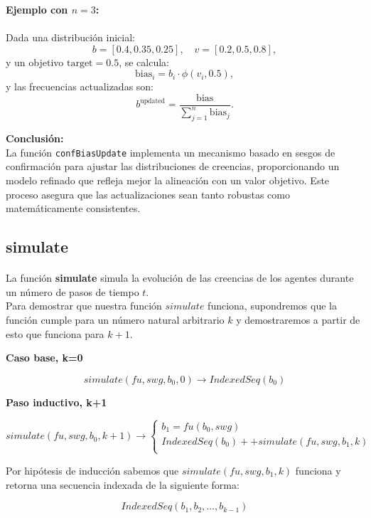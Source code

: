 \documentclass{article}
\begin{document}
	\textbf{Ejemplo con $n=3$:}\\\\
	Dada una distribución inicial:
	\[
	b = [0.4, 0.35, 0.25], \quad v = [0.2, 0.5, 0.8],
	\]
	y un objetivo $\text{target} = 0.5$, se calcula:
	\[
	\text{bias}_i = b_i \cdot \phi(v_i, 0.5),
	\]
	y las frecuencias actualizadas son:
	\[
	b^{\text{updated}} = \frac{\text{bias}}{\sum_{j=1}^n \text{bias}_j}.
	\]
	
	\textbf{Conclusión:}\\
	La función \texttt{confBiasUpdate} implementa un mecanismo basado en sesgos de confirmación para ajustar las distribuciones de creencias, proporcionando un modelo refinado que refleja mejor la alineación con un valor objetivo. Este proceso asegura que las actualizaciones sean tanto robustas como matemáticamente consistentes.



    \subsection{simulate}

    \paragraph{}
    La función \textbf{simulate} simula la evolución de las creencias de los agentes durante un número de pasos de tiempo $t$.
    \\

    Para demostrar que nuestra función $simulate$ funciona, supondremos que la función cumple para un número natural arbitrario $k$ y demostraremos a partir de esto que funciona para $k+1$.

    \textbf{Caso base, k=0}
    
    \[simulate(fu,swg,b_0,0) \rightarrow IndexedSeq(b_0)\]

    \textbf{Paso inductivo, k+1}

    \[simulate(fu,swg,b_0,k+1) \rightarrow 
    \begin{cases} 
    b_1=fu(b_0,swg) \\
    IndexedSeq(b_0)++simulate(fu,swg,b_1,k) \\
    \end{cases}\]

    Por hipótesis de inducción sabemos que $simulate(fu,swg,b_1,k)$ funciona y retorna una secuencia indexada de la siguiente forma:

    \[IndexedSeq(b_1,b_2,\ldots,b_{k-1})\]
\end{document}
